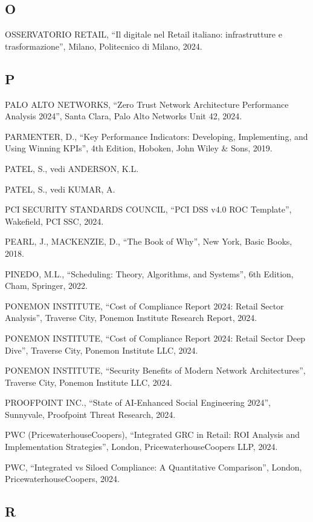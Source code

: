 \documentclass{report}
\begin{document}
\subsection{O}\label{o-1}

OSSERVATORIO RETAIL, ``Il digitale nel Retail italiano: infrastrutture e
trasformazione'', Milano, Politecnico di Milano, 2024.

\subsection{P}\label{p-1}

PALO ALTO NETWORKS, ``Zero Trust Network Architecture Performance
Analysis 2024'', Santa Clara, Palo Alto Networks Unit 42, 2024.

PARMENTER, D., ``Key Performance Indicators: Developing, Implementing,
and Using Winning KPIs'', 4th Edition, Hoboken, John Wiley \& Sons,
2019.

PATEL, S., vedi ANDERSON, K.L.

PATEL, S., vedi KUMAR, A.

PCI SECURITY STANDARDS COUNCIL, ``PCI DSS v4.0 ROC Template'',
Wakefield, PCI SSC, 2024.

PEARL, J., MACKENZIE, D., ``The Book of Why'', New York, Basic Books,
2018.

PINEDO, M.L., ``Scheduling: Theory, Algorithms, and Systems'', 6th
Edition, Cham, Springer, 2022.

PONEMON INSTITUTE, ``Cost of Compliance Report 2024: Retail Sector
Analysis'', Traverse City, Ponemon Institute Research Report, 2024.

PONEMON INSTITUTE, ``Cost of Compliance Report 2024: Retail Sector Deep
Dive'', Traverse City, Ponemon Institute LLC, 2024.

PONEMON INSTITUTE, ``Security Benefits of Modern Network
Architectures'', Traverse City, Ponemon Institute LLC, 2024.

PROOFPOINT INC., ``State of AI-Enhanced Social Engineering 2024'',
Sunnyvale, Proofpoint Threat Research, 2024.

PWC (PricewaterhouseCoopers), ``Integrated GRC in Retail: ROI Analysis
and Implementation Strategies'', London, PricewaterhouseCoopers LLP,
2024.

PWC, ``Integrated vs Siloed Compliance: A Quantitative Comparison'',
London, PricewaterhouseCoopers, 2024.

\subsection{R}\label{r-1}
\end{document}
